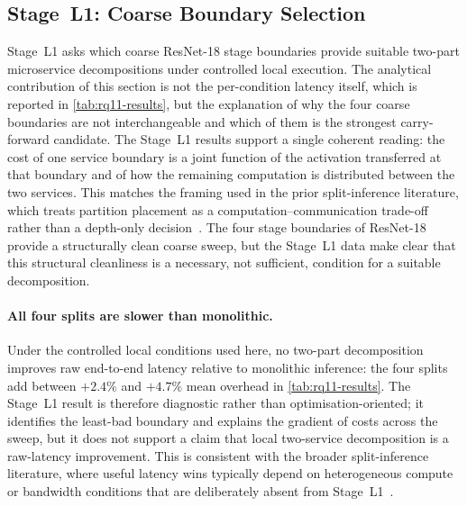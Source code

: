 \subsection{Stage~L1: Coarse Boundary Selection}
\label{sec:analysis-rq11}

Stage~L1 asks which coarse ResNet-18 stage boundaries provide suitable
two-part microservice decompositions under controlled local execution.
The analytical contribution of this section is not the per-condition
latency itself, which is reported in \cref{tab:rq11-results}, but the
explanation of why the four coarse boundaries are not interchangeable
and which of them is the strongest carry-forward candidate. The
Stage~L1 results support a single coherent reading: the cost of one
service boundary is a joint function of the activation transferred at
that boundary and of how the remaining computation is distributed
between the two services. This matches the framing used in the prior
split-inference literature, which treats partition placement as a
computation--communication trade-off rather than a depth-only
decision~\cite{neurosurgeon,dnnsplit}. The four stage boundaries of
ResNet-18~\cite{resnet} provide a structurally clean coarse sweep, but
the Stage~L1 data make clear that this structural cleanliness is a
necessary, not sufficient, condition for a suitable decomposition.

\paragraph{All four splits are slower than monolithic.}
Under the controlled local conditions used here, no two-part
decomposition improves raw end-to-end latency relative to monolithic
inference: the four splits add between \(+2.4\%\) and \(+4.7\%\) mean
overhead in \cref{tab:rq11-results}. The Stage~L1 result is therefore
diagnostic rather than optimisation-oriented; it identifies the
least-bad boundary and explains the gradient of costs across the
sweep, but it does not support a claim that local two-service
decomposition is a raw-latency improvement. This is consistent with
the broader split-inference literature, where useful latency wins
typically depend on heterogeneous compute or bandwidth conditions that
are deliberately absent from Stage~L1~\cite{neurosurgeon,dnnsplit}.


